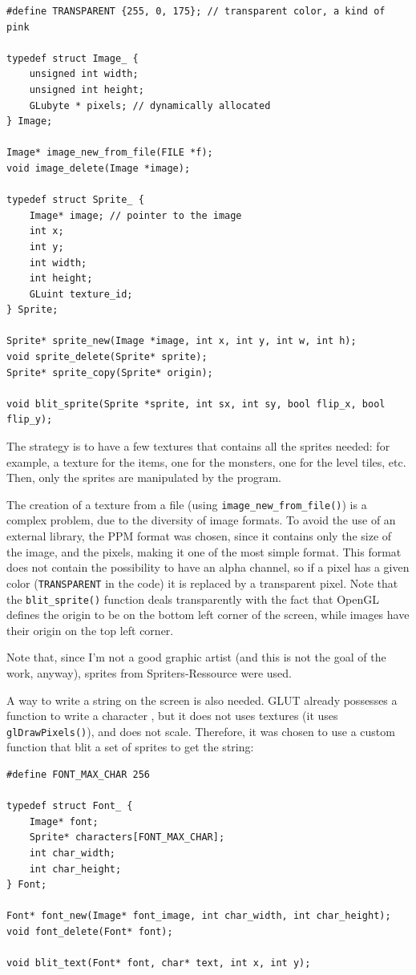 \documentclass[12pt,a4paper]{article}
\newcommand{\cc}[1]{\texttt{#1}}
\begin{document}
\begin{verbatim}
#define TRANSPARENT {255, 0, 175}; // transparent color, a kind of pink

typedef struct Image_ {
	unsigned int width;
	unsigned int height;
	GLubyte * pixels; // dynamically allocated
} Image;

Image* image_new_from_file(FILE *f);
void image_delete(Image *image);

typedef struct Sprite_ {
	Image* image; // pointer to the image
	int x;
	int y;
	int width;
	int height;
	GLuint texture_id;
} Sprite;

Sprite* sprite_new(Image *image, int x, int y, int w, int h);
void sprite_delete(Sprite* sprite);
Sprite* sprite_copy(Sprite* origin);

void blit_sprite(Sprite *sprite, int sx, int sy, bool flip_x, bool flip_y);
\end{verbatim}

The strategy is to have a few textures that contains all the sprites needed: for example, a texture for the items, one for the monsters, one for the level tiles, etc. Then, only the sprites are manipulated by the program.

The creation of a texture from a file (using \cc{image_new_from_file()}) is a complex problem, due to the diversity of image formats. To avoid the use of an external library, the PPM format \cite{ppmformat} was chosen, since it contains only the size of the image, and the pixels, making it one of the most simple format. This format does not contain the possibility to have an alpha channel, so if a pixel has a given color (\cc{TRANSPARENT} in the code) it is replaced by a transparent pixel. Note that the \cc{blit_sprite()} function deals transparently with the fact that OpenGL defines the origin to be on the bottom left corner of the screen, while images have their origin on the top left corner. 

Note that, since I'm not a good graphic artist (and this is not the goal of the work, anyway), sprites from Spriters-Ressource \cite{spriters} were used.

A way to write a string on the screen is also needed. GLUT already possesses a function to write a character \cite{glutrefchar}, but it does not uses textures (it uses \cc{glDrawPixels()}), and does not scale. Therefore, it was chosen to use a custom function that blit a set of sprites to get the string:

\begin{verbatim}
#define FONT_MAX_CHAR 256

typedef struct Font_ {
	Image* font;
	Sprite* characters[FONT_MAX_CHAR];
    int char_width;
    int char_height;
} Font;

Font* font_new(Image* font_image, int char_width, int char_height);
void font_delete(Font* font);

void blit_text(Font* font, char* text, int x, int y);
\end{verbatim}
\end{document}
